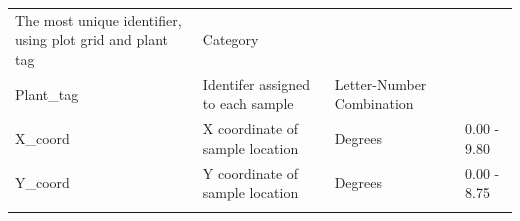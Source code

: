 \documentclass[
  12pt,
]{article}
\begin{document}
\begin{longtable}[]{@{}llll@{}}
\begin{minipage}[t]{0.37\columnwidth}
The most unique identifier, using plot grid and plant tag\strut
\end{minipage} & \begin{minipage}[t]{0.19\columnwidth}\raggedright
Category\strut
\end{minipage} & \begin{minipage}[t]{0.20\columnwidth}\raggedright
\strut
\end{minipage}\tabularnewline
\begin{minipage}[t]{0.13\columnwidth}\raggedright
Plant\_tag\strut
\end{minipage} & \begin{minipage}[t]{0.37\columnwidth}\raggedright
Identifer assigned to each sample\strut
\end{minipage} & \begin{minipage}[t]{0.19\columnwidth}\raggedright
Letter-Number Combination\strut
\end{minipage} & \begin{minipage}[t]{0.20\columnwidth}\raggedright
\strut
\end{minipage}\tabularnewline
\begin{minipage}[t]{0.13\columnwidth}\raggedright
X\_coord\strut
\end{minipage} & \begin{minipage}[t]{0.37\columnwidth}\raggedright
X coordinate of sample location\strut
\end{minipage} & \begin{minipage}[t]{0.19\columnwidth}\raggedright
Degrees\strut
\end{minipage} & \begin{minipage}[t]{0.20\columnwidth}\raggedright
0.00 - 9.80\strut
\end{minipage}\tabularnewline
\begin{minipage}[t]{0.13\columnwidth}\raggedright
Y\_coord\strut
\end{minipage} & \begin{minipage}[t]{0.37\columnwidth}\raggedright
Y coordinate of sample location\strut
\end{minipage} & \begin{minipage}[t]{0.19\columnwidth}\raggedright
Degrees\strut
\end{minipage} & \begin{minipage}[t]{0.20\columnwidth}\raggedright
0.00 - 8.75\strut
\end{minipage}\tabularnewline
\begin{minipage}[t]{0.13\columnwidth}\raggedright

\end{minipage}
\end{longtable}
\end{document}
